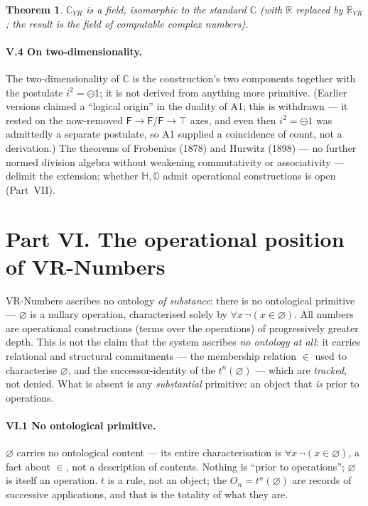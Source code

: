 \documentclass[11pt]{article}
\newtheorem{theorem}{Theorem}
\theoremstyle{definition}
\newcommand{\zero}{\varnothing}
\newcommand{\F}{\mathsf{F}}
\newcommand{\T}{\top}
\newcommand{\Obj}{O}
\newcommand{\R}{\mathbb{R}}
\newcommand{\C}{\mathbb{C}}
\newcommand{\isub}{\ominus}              %
\begin{document}
\begin{theorem}
$\C_{VR}$ is a field, isomorphic to the standard $\C$ (with $\R$ replaced by $\R_{VR}$; the result is
the field of computable complex numbers).
\end{theorem}

\paragraph{V.4 On two-dimensionality.} The two-dimensionality of $\C$ is the construction's two
components together with the postulate $i^2=\isub 1$; it is not derived from anything more primitive.
(Earlier versions claimed a ``logical origin'' in the duality of A1; this is withdrawn --- it rested on
the now-removed $\F\to\F$/$\F\to\T$ axes, and even then $i^2=\isub 1$ was admittedly a separate
postulate, so A1 supplied a coincidence of count, not a derivation.) The theorems of Frobenius (1878)
and Hurwitz (1898) --- no further normed division algebra without weakening commutativity or
associativity --- delimit the extension; whether $\mathbb{H},\mathbb{O}$ admit operational
constructions is open (Part~VII).

\section*{Part VI. The operational position of VR-Numbers}

VR-Numbers ascribes no ontology \emph{of substance}: there is no ontological primitive --- $\zero$ is a nullary operation,
characterised solely by $\forall x\,\neg(x\in\zero)$. All numbers are operational constructions (terms
over the operations) of progressively greater depth. This is not the claim that the system ascribes
\emph{no ontology at all}: it carries relational and structural commitments --- the membership relation
$\in$ used to characterise $\zero$, and the successor-identity of the $t^n(\zero)$ --- which are
\emph{tracked}, not denied. What is absent is any \emph{substantial} primitive: an object that \emph{is}
prior to operations.

\paragraph{VI.1 No ontological primitive.} $\zero$ carries no ontological content --- its entire
characterisation is $\forall x\,\neg(x\in\zero)$, a fact about $\in$, not a description of contents.
Nothing is ``prior to operations''; $\zero$ is itself an operation. $t$ is a rule, not an object; the
$\Obj_n=t^n(\zero)$ are records of successive applications, and that is the totality of what they are.
\end{document}
